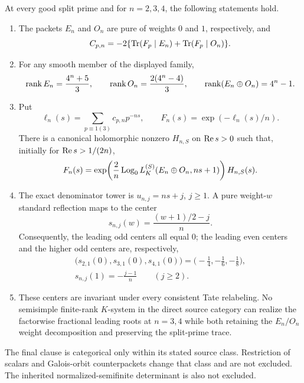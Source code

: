 \begin{theorem}\label{thm:main}
At every good split prime and for \(n=2,3,4\), the following statements
hold.
\begin{enumerate}
\item The packets \(E_n\) and \(O_n\) are pure of weights \(0\) and \(1\),
respectively, and
\begin{equation}\label{eq:trace-main}
 C_{p,n}=-2\{\operatorname{Tr}(F_p\mid E_n)+\operatorname{Tr}(F_p\mid O_n)\}.
\end{equation}
\item For any smooth member of the displayed family,
\[
 \operatorname{rank} E_n=\frac{4^n+5}{3},\qquad
 \operatorname{rank} O_n=\frac{2(4^n-4)}{3},\qquad
 \operatorname{rank}(E_n\oplus O_n)=4^n-1.
\]
\item Put
\[
 \ell_n(s)=\sum_{p\equiv1(3)}c_{p,n}p^{-ns},\qquad
 F_n(s)=\exp(-\ell_n(s)/n).
\]
There is a canonical holomorphic nonzero \(H_{n,S}\) on \(\operatorname{Re} s>0\)
such that, initially for \(\operatorname{Re} s>1/(2n)\),
\begin{equation}\label{eq:main-extraction}
 F_n(s)=
 \exp\!\left(\frac2n\operatorname{Log}_0
 L_K^{(S)}(E_n\oplus O_n,ns+1)\right)H_{n,S}(s).
\end{equation}
\item The exact denominator tower is \(u_{n,j}=ns+j\), \(j\ge1\).
A pure weight-\(w\) standard reflection maps to the center
\[
 s_{n,j}(w)=\frac{(w+1)/2-j}{n}.
\]
Consequently, the leading odd centers all equal \(0\); the leading even
centers and the higher odd centers are, respectively,
\[
 \begin{gathered}
  \bigl(s_{2,1}(0),s_{3,1}(0),s_{4,1}(0)\bigr)
    =\bigl(-\tfrac14,-\tfrac16,-\tfrac18\bigr),\\
  s_{n,j}(1)=-\frac{j-1}{n}\qquad (j\ge2).
 \end{gathered}
\]
\item These centers are invariant under every consistent Tate relabeling.
No semisimple finite-rank \(K\)-system in the direct source category can
realize the factorwise fractional leading roots at \(n=3,4\) while both
retaining the \(E_n/O_n\) weight decomposition and preserving the
split-prime trace.
\end{enumerate}
\end{theorem}

The final clause is categorical only within its stated source class.
Restriction of scalars and Galois-orbit counterpackets change that class
and are not excluded.  The inherited normalized-semifinite determinant is
also not excluded.

